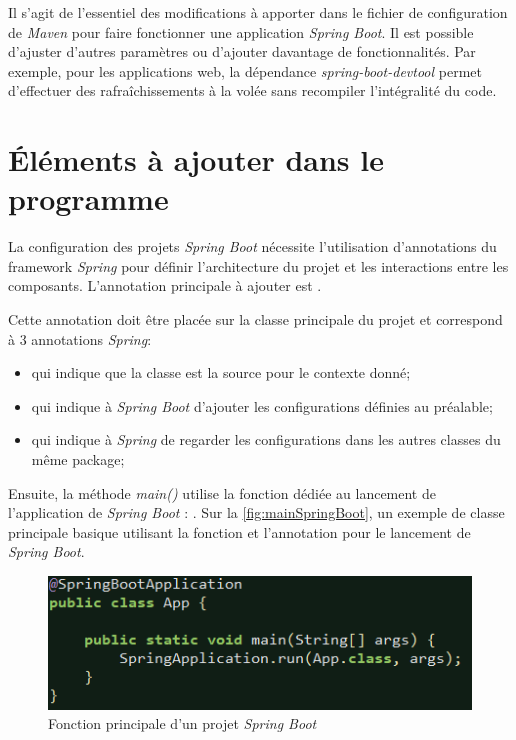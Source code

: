 \documentclass{polytech/polytech}
\begin{document}
Il s’agit de l’essentiel des modifications à apporter dans le fichier de configuration de \textit{Maven} pour faire fonctionner une application \textit{Spring Boot}. Il est possible d’ajuster d’autres paramètres ou d’ajouter davantage de fonctionnalités. Par exemple, pour les applications web, la dépendance \textit{spring-boot-devtool} permet d’effectuer des rafraîchissements à la volée sans recompiler l’intégralité du code. 


\section{Éléments à ajouter dans le programme}
\label{sec:elementsSpringBoot}

La configuration des projets \textit{Spring Boot} nécessite l’utilisation d’annotations du framework \textit{Spring} pour définir l’architecture du projet et les interactions entre les composants. L’annotation principale à ajouter est .


Cette annotation doit être placée sur la classe principale du projet et correspond à 3 annotations \textit{Spring}:
\begin{itemize}
	\item {} qui indique que la classe est la source pour le contexte donné;
	\item {} qui indique à \textit{Spring Boot} d’ajouter les configurations définies au préalable;
	\item {} qui indique à \textit{Spring} de regarder les configurations dans les autres classes du même package;
\end{itemize}

Ensuite, la méthode \textit{main()} utilise la fonction dédiée au lancement de l’application de \textit{Spring Boot} : . Sur la \autoref{fig:mainSpringBoot}, un exemple de classe principale basique utilisant la fonction  et l’annotation pour le lancement de \textit{Spring Boot}.

\begin{figure}
	\includegraphics[scale=1]{images/mainSpringBoot}
	\caption{Fonction principale d'un projet \textit{Spring Boot}}
	\label{fig:mainSpringBoot}
\end{figure}
\end{document}
